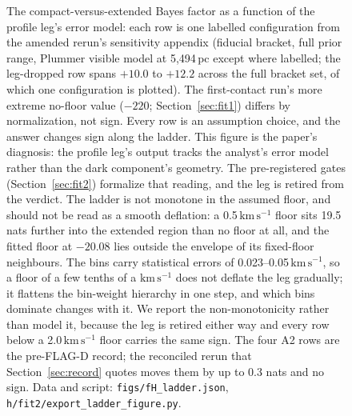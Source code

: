 \documentclass[11pt]{article}
\newcommand{\lnK}{\ensuremath{\ln K}}
\newcommand{\kms}{\ensuremath{\mathrm{km\,s^{-1}}}}
\begin{document}
\begin{figure}[tbp]
\centering
{}
\caption{The compact-versus-extended Bayes factor as a function of the profile leg's error model: each row is one labelled configuration from the amended rerun's sensitivity appendix (fiducial bracket, full prior range, Plummer visible model at 5{,}494\,pc except where labelled; the leg-dropped row spans $+10.0$ to $+12.2$ across the full bracket set, of which one configuration is plotted). The first-contact run's more extreme no-floor value ($-220$; Section~\ref{sec:fit1}) differs by normalization, not sign. Every row is an assumption choice, and the answer changes sign along the ladder. This figure is the paper's diagnosis: the profile leg's output tracks the analyst's error model rather than the dark component's geometry. The pre-registered gates (Section~\ref{sec:fit2}) formalize that reading, and the leg is retired from the verdict. The ladder is not monotone in the assumed floor, and should not be read as a smooth deflation: a 0.5\,\kms{} floor sits 19.5 nats further into the extended region than no floor at all, and the fitted floor at $-20.08$ lies outside the envelope of its fixed-floor neighbours. The bins carry statistical errors of 0.023--0.05\,\kms, so a floor of a few tenths of a \kms{} does not deflate the leg gradually; it flattens the bin-weight hierarchy in one step, and which bins dominate changes with it. We report the non-monotonicity rather than model it, because the leg is retired either way and every row below a 2.0\,\kms{} floor carries the same sign. The four A2 rows are the pre-FLAG-D record; the reconciled rerun that Section~\ref{sec:record} quotes moves them by up to 0.3 nats and no sign. Data and script: \texttt{figs/fH\_ladder.json}, \texttt{h/fit2/export\_ladder\_figure.py}.}

\end{figure}
\end{document}
